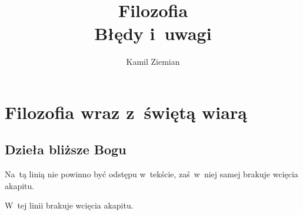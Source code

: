 \documentclass[a4paper,11pt]{article}
\title{Filozofia \\
  {\Large Błędy i~uwagi}}
\author{Kamil Ziemian}
\begin{document}





\maketitle  %





\section{Filozofia wraz z~świętą wiarą}











\subsection{Dzieła bliższe Bogu}

\vspace{\spaceTwo}




\vspace{0em}



\vspace{0em}


\noindent
{} Na~tą linią nie powinno być odstępu w~tekście, zaś~w~niej
samej brakuje wcięcia akapitu.

\vspace{\spaceFour}





\noindent
{} W~tej linii brakuje wcięcia akapitu.
\end{document}
